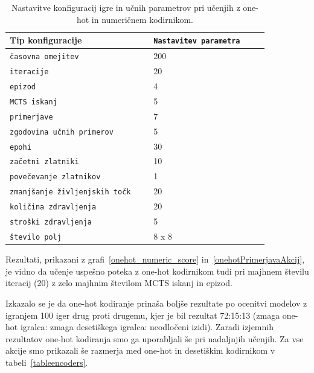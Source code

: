 \documentclass[a4paper, 12pt]{book}
\begin{document}
\begin{table}
	\begin{center}
		\begin{tabular}{p{0.5\linewidth}|p{0.4\linewidth}}
			Tip konfiguracije                          & {\tt Nastavitev parametra} \\ \hline
			{\tt časovna omejitev}                     & 200                        \\
			{\tt iteracije}                            & 20                         \\
			{\tt epizod}                               & 4                          \\
			{\tt MCTS iskanj}                          & 5                          \\
			{\tt primerjave}                           & 7                          \\
			{\tt zgodovina učnih primerov}             & 5                          \\
			{\tt epohi}                                & 30                         \\
			{\tt začetni zlatniki}                     & 10                         \\
			{\tt povečevanje zlatnikov}                & 1                          \\
			{\tt zmanjšanje življenjskih točk}         & 20                         \\
			{\tt količina zdravljenja}                 & 20                         \\
			{\tt stroški zdravljenja}                  & 5                          \\
			{\tt število polj}                         & 8 x 8                      \\	
		\end{tabular}
	\end{center}
	\caption{Nastavitve konfiguracij igre in učnih parametrov pri učenjih z one-hot in numeričnem kodirnikom.}
	\label{tableCompareOneHotNumeric}
\end{table}

Rezultati, prikazani z grafi~\ref{onehot_numeric_score} in~\ref{onehotPrimerjavaAkcij}, je vidno da učenje uspešno poteka z one-hot kodirnikom tudi pri majhnem številu iteracij (20) z zelo majhnim številom MCTS iskanj in epizod.

Izkazalo se je da one-hot kodiranje prinaša boljše rezultate po ocenitvi modelov z igranjem 100 iger drug proti drugemu, kjer je bil rezultat 72:15:13 (zmaga one-hot igralca: zmaga desetiškega igralca: neodločeni izidi).
Zaradi izjemnih rezultatov one-hot kodiranja smo ga uporabljali še pri nadaljnjih učenjih.
Za vse akcije smo prikazali še razmerja med one-hot in desetiškim kodirnikom v tabeli~\ref{tableencoders}.
\end{document}
